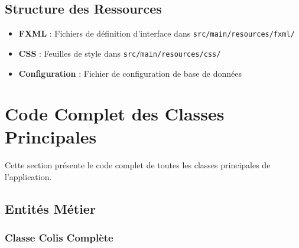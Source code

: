 \documentclass{rapportENSIAS}
\begin{document}
\subsection{Structure des Ressources}
\begin{itemize}
    \item \textbf{FXML} : Fichiers de d\'{e}finition d'interface dans \texttt{src/main/resources/fxml/}
    \item \textbf{CSS} : Feuilles de style dans \texttt{src/main/resources/css/}
    \item \textbf{Configuration} : Fichier de configuration de base de donn\'{e}es
\end{itemize}

\section{Code Complet des Classes Principales}

Cette section pr\'{e}sente le code complet de toutes les classes principales de l'application.

\subsection{Entit\'{e}s M\'{e}tier}

\subsubsection{Classe Colis Compl\`{e}te}
\end{document}
